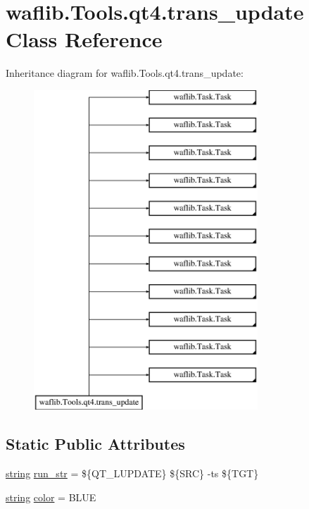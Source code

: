 \hypertarget{classwaflib_1_1_tools_1_1qt4_1_1trans__update}{}\section{waflib.\+Tools.\+qt4.\+trans\+\_\+update Class Reference}
\label{classwaflib_1_1_tools_1_1qt4_1_1trans__update}
Inheritance diagram for waflib.\+Tools.\+qt4.\+trans\+\_\+update\+:\begin{figure}[H]
\begin{center}
\leavevmode
\includegraphics[height=12.000000cm]{classwaflib_1_1_tools_1_1qt4_1_1trans__update}
\end{center}
\end{figure}
\subsection*{Static Public Attributes}
\begin{DoxyCompactItemize}
\item 
\hyperlink{test__lib_f_l_a_c_2format_8c_ab02026ad0de9fb6c1b4233deb0a00c75}{string} \hyperlink{classwaflib_1_1_tools_1_1qt4_1_1trans__update_af42e2219930192472fa19b54ccc678ce}{run\+\_\+str} = \textquotesingle{}\$\{Q\+T\+\_\+\+L\+U\+P\+D\+A\+TE\} \$\{S\+RC\} -\/ts \$\{T\+GT\}\textquotesingle{}
\item 
\hyperlink{test__lib_f_l_a_c_2format_8c_ab02026ad0de9fb6c1b4233deb0a00c75}{string} \hyperlink{classwaflib_1_1_tools_1_1qt4_1_1trans__update_ada6a7abbee06be6064c541aab1a77b0d}{color} = \textquotesingle{}B\+L\+UE\textquotesingle{}
\end{DoxyCompactItemize}
